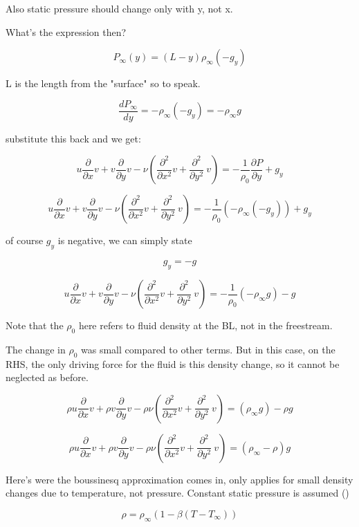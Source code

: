 \documentclass[11pt]{article}
\begin{document}
Also static pressure should change only with y, not x.

What's the expression then?

$$P_\infty (y) = (L-y)\rho_\infty (-g_y) $$ 

L is the length from the "surface" so to speak.


$$\frac{d P_\infty}{dy} = -\rho_\infty (-g_y) = -\rho_\infty g$$

substitute this back and we get:

$$ u \frac{\partial}{\partial x} v + v \frac{\partial}{\partial y} v  - \nu ( \frac{\partial^2}{\partial x^2} v + \frac{\partial^2}{\partial y^2} \ v ) = - \frac{1}{\rho_0} \frac{\partial P}{\partial y} +g_y$$

$$ u \frac{\partial}{\partial x} v + v \frac{\partial}{\partial y} v  - \nu ( \frac{\partial^2}{\partial x^2} v + \frac{\partial^2}{\partial y^2} \ v ) = - \frac{1}{\rho_0} (-\rho_\infty (-g_y)) +g_y$$

of course $g_y$ is negative, we can simply state

$$g_y = -g$$

$$ u \frac{\partial}{\partial x} v + v \frac{\partial}{\partial y} v  - \nu ( \frac{\partial^2}{\partial x^2} v + \frac{\partial^2}{\partial y^2} \ v ) = - \frac{1}{\rho_0} (-\rho_\infty g) -g$$

Note that the $\rho_0$ here refers to fluid density at the BL, not in the freestream.

The change in $\rho_0$ was small compared to other terms. But in this case, on the RHS, the only driving force for the fluid is this density change, so it cannot be neglected as before.

$$\rho u \frac{\partial}{\partial x} v + \rho v \frac{\partial}{\partial y} v  -\rho \nu ( \frac{\partial^2}{\partial x^2} v + \frac{\partial^2}{\partial y^2} \ v ) = (\rho_\infty g) - \rho g$$

$$\rho u \frac{\partial}{\partial x} v + \rho v \frac{\partial}{\partial y} v  -\rho \nu ( \frac{\partial^2}{\partial x^2} v + \frac{\partial^2}{\partial y^2} \ v ) = (\rho_\infty - \rho)  g$$


Here's were the boussinesq approximation comes in, only applies for small density changes due to temperature, not pressure. Constant static pressure is assumed (\cite{bejan2013convection})

$$\rho = \rho_\infty (1- \beta(T-T_\infty))$$
\end{document}
